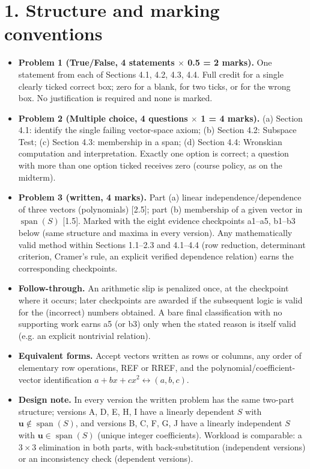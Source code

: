 \documentclass[11pt,a4paper]{article}
\begin{document}
\section*{1. Structure and marking conventions}
\begin{itemize}[leftmargin=5mm,itemsep=1pt]
\item \textbf{Problem 1 (True/False, 4 statements $\times$ 0.5 = 2 marks).} One statement from each of Sections 4.1, 4.2, 4.3, 4.4. Full credit for a single clearly ticked correct box; zero for a blank, for two ticks, or for the wrong box. No justification is required and none is marked.
\item \textbf{Problem 2 (Multiple choice, 4 questions $\times$ 1 = 4 marks).} (a) Section 4.1: identify the single failing vector-space axiom; (b) Section 4.2: Subspace Test; (c) Section 4.3: membership in a span; (d) Section 4.4: Wronskian computation and interpretation. Exactly one option is correct; a question with more than one option ticked receives zero (course policy, as on the midterm).
\item \textbf{Problem 3 (written, 4 marks).} Part (a) linear independence/dependence of three vectors (polynomials) [2.5]; part (b) membership of a given vector in $\operatorname{span}(S)$ [1.5]. Marked with the eight evidence checkpoints a1--a5, b1--b3 below (same structure and maxima in every version). Any mathematically valid method within Sections 1.1--2.3 and 4.1--4.4 (row reduction, determinant criterion, Cramer's rule, an explicit verified dependence relation) earns the corresponding checkpoints.
\item \textbf{Follow-through.} An arithmetic slip is penalized once, at the checkpoint where it occurs; later checkpoints are awarded if the subsequent logic is valid for the (incorrect) numbers obtained. A bare final classification with no supporting work earns a5 (or b3) only when the stated reason is itself valid (e.g. an explicit nontrivial relation).
\item \textbf{Equivalent forms.} Accept vectors written as rows or columns, any order of elementary row operations, REF or RREF, and the polynomial/coefficient-vector identification $a+bx+cx^2\leftrightarrow(a,b,c)$.
\item \textbf{Design note.} In every version the written problem has the same two-part structure; versions A, D, E, H, I have a linearly dependent $S$ with $\mathbf{u}\notin\operatorname{span}(S)$, and versions B, C, F, G, J have a linearly independent $S$ with $\mathbf{u}\in\operatorname{span}(S)$ (unique integer coefficients). Workload is comparable: a $3\times3$ elimination in both parts, with back-substitution (independent versions) or an inconsistency check (dependent versions).
\end{itemize}
\end{document}

